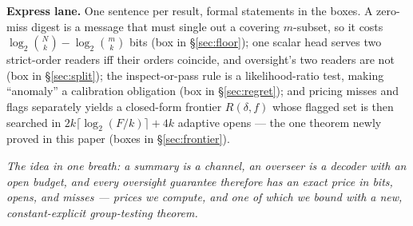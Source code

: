 \documentclass[11pt,a4paper]{article}
\newcommand{\onebreath}[1]{\begin{center}\emph{#1}\end{center}}
\begin{document}
\textbf{Express lane.} One sentence per result, formal statements in the boxes. A zero-miss digest is a message that must single out a covering $m$-subset, so it costs $\log_2\binom{N}{k}-\log_2\binom{m}{k}$ bits (box in \S\ref{sec:floor}); one scalar head serves two strict-order readers iff their orders coincide, and oversight's two readers are not (box in \S\ref{sec:split}); the inspect-or-pass rule is a likelihood-ratio test, making ``anomaly'' a calibration obligation (box in \S\ref{sec:regret}); and pricing misses and flags separately yields a closed-form frontier $R(\delta,f)$ whose flagged set is then searched in $2k\lceil\log_2(F/k)\rceil+4k$ adaptive opens --- the one theorem newly proved in this paper (boxes in \S\ref{sec:frontier}).

\onebreath{The idea in one breath: a summary is a channel, an overseer is a decoder with an open budget, and every oversight guarantee therefore has an exact price in bits, opens, and misses --- prices we compute, and one of which we bound with a new, constant-explicit group-testing theorem.}
\end{document}

